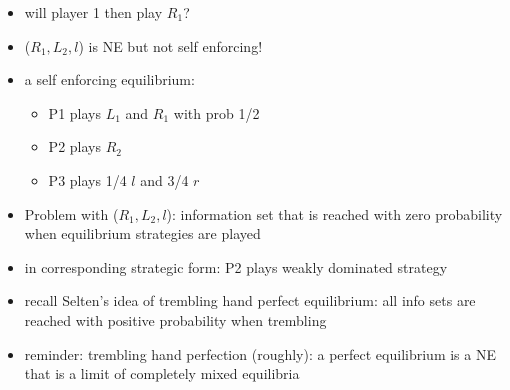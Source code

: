 \documentclass{beamer}    %
\newcommand{\Ra}{\Rightarrow}
\theoremstyle{plain}
\theoremstyle{definition}
\begin{document}
{\begin{itemize}
\item will player 1 then play $R_1$? %
\item ($R_1,L_2,l$) is NE but not self enforcing!
\item a self enforcing equilibrium:
  \begin{itemize}
  \item P1 plays $L_1$ and $R_1$ with prob 1/2
   \item P2 plays $R_2$
   \item P3 plays 1/4 $l$ and 3/4 $r$
  \end{itemize}
\end{itemize}

\framebreak

\begin{itemize}
\item Problem with ($R_1,L_2,l$): information set that is reached with zero probability when equilibrium strategies are played
\item in corresponding strategic form: P2 plays weakly dominated strategy %
\item recall Selten's idea of trembling hand perfect equilibrium: %
all info sets are reached with positive probability when trembling %
\item reminder: trembling hand perfection (roughly): a perfect equilibrium is a NE that is a limit of completely mixed equilibria
\end{itemize}

\framebreak

}
\end{document}
